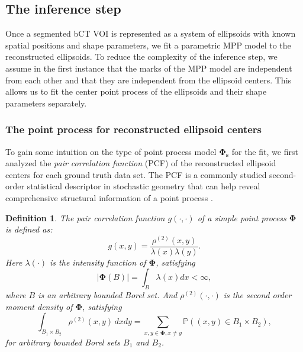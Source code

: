 \documentclass[journal]{IEEEtran}
\newtheorem{define}{Definition}[section]%
\begin{document}
\setcounter{table}{0}

\subsection{The inference step}
\label{sec:infer-step:-fitt}

Once a segmented bCT VOI is represented as a system of ellipsoids with
known spatial positions and shape parameters, we fit a parametric MPP
model to the reconstructed ellipsoids. To reduce the complexity of the
inference step, we assume in the first instance that the marks of the
MPP model are independent from each other and that they are
independent from the ellipsoid centers. This allows us to fit the
center point process of the ellipsoids and their shape parameters
separately.

\subsubsection{The point process for reconstructed ellipsoid centers}
\label{sec:point-proc-reconstr}

To gain some intuition on the type of point process model
$\mathbf{\Phi_s}$ for the fit, we first analyzed the \textit{pair
  correlation function} (PCF) of the reconstructed ellipsoid centers
for each ground truth data set. The PCF is a commonly studied
second-order statistical descriptor in stochastic geometry that can
help reveal comprehensive structural information of a point process
\cite{baddeley2007spatial}.

\begin{define}

  The pair correlation function \textit{$g(\cdot, \cdot)$} of a simple
  point process $\mathbf{\Phi}$ is defined as:
  \begin{equation}
    \label{eq:pcf-official-def}
    g(x,y)=\frac{\rho^{(2)}(x,y)}{\lambda(x) \lambda(y)}.
  \end{equation}
  Here $\lambda(\cdot)$ is the intensity function of $\mathbf{\Phi}$,
  satisfying
  \begin{equation}
    \label{eq:intensity-func}
    |\mathbf{\Phi} (B)| = \int_{B} \lambda(x) dx < \infty,
  \end{equation}
  where $B$ is an arbitrary bounded Borel set. And
  $\rho^{(2)}(\cdot, \cdot)$ is the second order moment density of
  $\mathbf{\Phi}$, satisfying
  \begin{equation}
    \label{eq:second-order-moment}
    \int_{B_{1} \times B_{2}} \rho^{(2)}(x,y) \, dx dy
    = \sum_{x, y \in \mathbf{\Phi}, x \neq y} \mathbb{P} \left( (x,y)
      \in B_{1} \times B_{2} \right),
  \end{equation}
  for arbitrary bounded Borel sets $B_1$ and $B_2$.
\end{define}
\end{document}
